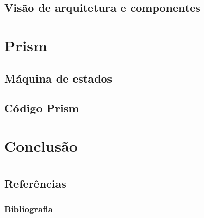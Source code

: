 \documentclass{beamer}[10]
\begin{document}
    \subsection{Visão de arquitetura e componentes}

    \section{Prism}

    \subsection{Máquina de estados}
    \subsection{Código Prism}

    \section{Conclusão}
    



    \appendix
    \section*{\appendixname}
    \subsection*{Referências}

    \begin{frame}[allowframebreaks]
      \frametitle{Bibliografia}
        \nocite{google}
        
        

    \end{frame}
\end{document}
